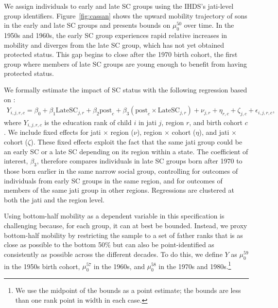 \documentclass[12pt,letterpaper]{article}
\numberwithin{equation}{section}
\begin{document}
We assign individuals to early and late SC groups using the IHDS's jati-level group identifiers. Figure~\ref{fig:cassan} shows the upward mobility trajectory of sons in the early and late SC groups and presents bounds on $\mu_0^{50}$ over time. In the 1950s and 1960s, the early SC group experiences rapid relative increases in mobility and diverges from the late SC group, which has not yet obtained protected status. This gap begins to close after the 1970 birth cohort, the first group where members of late SC groups are young enough to benefit from having protected status.

We formally estimate the impact of SC status with the following regression based on :
\begin{align}
  \label{eq:cassan}
  Y_{i,j,r,c} = \beta_0 + \beta_1 \text{LateSC}_{j,r} + \beta_2 \text{post}_{c} + \beta_3 \left( \text{post}_{c} \times \text{LateSC}_{j,r} \right) + \nu_{j,r} + \eta_{r,c} + \zeta_{j,c} + \epsilon_{i,j,r,c}\text{,}
\end{align}
\noindent where $Y_{i,j,r,c}$ is the education rank of child $i$ in jati $j$, region $r$, and birth cohort $c$. We include fixed effects for jati $ \times $ region ($\nu$), region $ \times $ cohort ($\eta$), and jati $ \times $ cohort ($\zeta$). These fixed effects exploit the fact that the same jati group could be an early SC or a late SC depending on its region within a state. The coefficient of interest, $\beta_3$, therefore compares individuals in late SC groups born after 1970 to those born earlier in the same narrow social group, controlling for outcomes of individuals from early SC groups in the same region, and for outcomes of members of the same jati group in other regions. Regressions are clustered at both the jati and the region level.

Using bottom-half mobility as a dependent variable in this specification is challenging because, for each group, it can at best be bounded. Instead, we proxy bottom-half mobility by restricting the sample to a set of father ranks that is as close as possible to the bottom 50\% but can also be point-identified as consistently as possible across the different decades. To do this, we define $Y$ as $\mu_0^{59}$ in the 1950s birth cohort, $\mu_0^{57}$ in the 1960s, and $\mu_0^{58}$ in the 1970s and 1980s.\footnote{We use the midpoint of the bounds as a point estimate; the bounds are less than one rank point in width in each case.}
\end{document}
